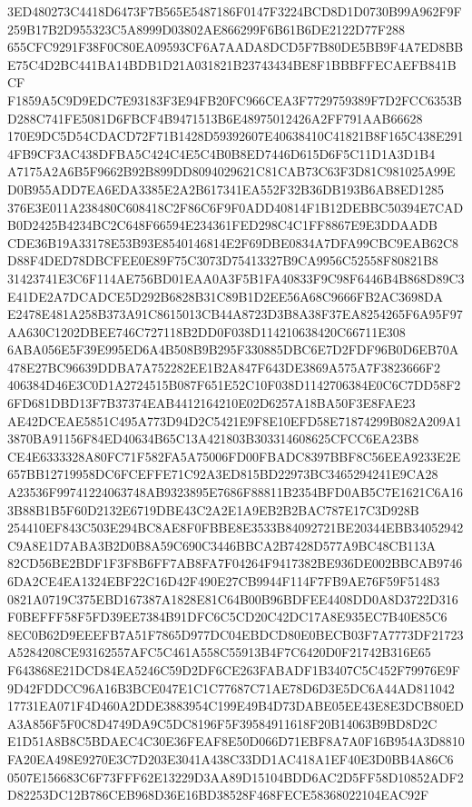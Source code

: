 \documentclass[UTF8,fontset=fandol,zihao=-4,a4paper]{ctexart}
\begin{document}
{{3ED480273C4418D6473F7B565E5487186F0147F3224BCD8D1D0730B99A962F9F259B17B2D955323C5A8999D03802AE866299F6B61B6DE2122D77F288
655CFC9291F38F0C80EA09593CF6A7AADA8DCD5F7B80DE5BB9F4A7ED8BBE75C4D2BC441BA14BDB1D21A031821B23743434BE8F1BBBFFECAEFB841BCF
F1859A5C9D9EDC7E93183F3E94FB20FC966CEA3F7729759389F7D2FCC6353BD288C741FE5081D6FBCF4B9471513B6E48975012426A2FF791AAB66628
170E9DC5D54CDACD72F71B1428D59392607E40638410C41821B8F165C438E2914FB9CF3AC438DFBA5C424C4E5C4B0B8ED7446D615D6F5C11D1A3D1B4
A7175A2A6B5F9662B92B899DD8094029621C81CAB73C63F3D81C981025A99ED0B955ADD7EA6EDA3385E2A2B617341EA552F32B36DB193B6AB8ED1285
376E3E011A238480C608418C2F86C6F9F0ADD40814F1B12DEBBC50394E7CADB0D2425B4234BC2C648F66594E234361FED298C4C1FF8867E9E3DDAADB
CDE36B19A33178E53B93E8540146814E2F69DBE0834A7DFA99CBC9EAB62C8D88F4DED78DBCFEE0E89F75C3073D75413327B9CA9956C52558F80821B8
31423741E3C6F114AE756BD01EAA0A3F5B1FA40833F9C98F6446B4B868D89C3E41DE2A7DCADCE5D292B6828B31C89B1D2EE56A68C9666FB2AC3698DA
E2478E481A258B373A91C8615013CB44A8723D3B8A38F37EA8254265F6A95F97AA630C1202DBEE746C727118B2DD0F038D114210638420C66711E308
6ABA056E5F39E995ED6A4B508B9B295F330885DBC6E7D2FDF96B0D6EB70A478E27BC96639DDBA7A752282EE1B2A847F643DE3869A575A7F3823666F2
406384D46E3C0D1A2724515B087F651E52C10F038D1142706384E0C6C7DD58F26FD681DBD13F7B37374EAB4412164210E02D6257A18BA50F3E8FAE23
AE42DCEAE5851C495A773D94D2C5421E9F8E10EFD58E71874299B082A209A13870BA91156F84ED40634B65C13A421803B303314608625CFCC6EA23B8
CE4E6333328A80FC71F582FA5A75006FD00FBADC8397BBF8C56EEA9233E2E657BB12719958DC6FCEFFE71C92A3ED815BD22973BC3465294241E9CA28
A23536F99741224063748AB9323895E7686F88811B2354BFD0AB5C7E1621C6A163B88B1B5F60D2132E6719DBE43C2A2E1A9EB2B2BAC787E17C3D928B
254410EF843C503E294BC8AE8F0FBBE8E3533B84092721BE20344EBB34052942C9A8E1D7ABA3B2D0B8A59C690C3446BBCA2B7428D577A9BC48CB113A
82CD56BE2BDF1F3F8B6FF7AB8FA7F04264F9417382BE936DE002BBCAB97466DA2CE4EA1324EBF22C16D42F490E27CB9944F114F7FB9AE76F59F51483
0821A0719C375EBD167387A1828E81C64B00B96BDFEE4408DD0A8D3722D316F0BEFFF58F5FD39EE7384B91DFC6C5CD20C42DC17A8E935EC7B40E85C6
8EC0B62D9EEEFB7A51F7865D977DC04EBDCD80E0BECB03F7A7773DF21723A5284208CE93162557AFC5C461A558C55913B4F7C6420D0F21742B316E65
F643868E21DCD84EA5246C59D2DF6CE263FABADF1B3407C5C452F79976E9F9D42FDDCC96A16B3BCE047E1C1C77687C71AE78D6D3E5DC6A44AD811042
17731EA071F4D460A2DDE3883954C199E49B4D73DABE05EE43E8E3DCB80EDA3A856F5F0C8D4749DA9C5DC8196F5F39584911618F20B14063B9BD8D2C
E1D51A8B8C5BDAEC4C30E36FEAF8E50D066D71EBF8A7A0F16B954A3D8810FA20EA498E9270E3C7D203E3041A438C33DD1AC418A1EF40E3D0BB4A86C6
0507E156683C6F73FFF62E13229D3AA89D15104BDD6AC2D5FF58D10852ADF2D82253DC12B786CEB968D36E16BD38528F468FECE58368022104EAC92F
}}
\end{document}

